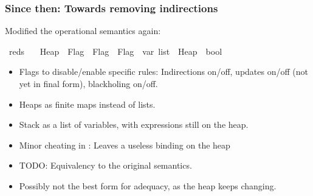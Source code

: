 \documentclass{beamer}
\begin{document}
\begin{frame}
\frametitle{Since then: Towards removing indirections}

Modified the operational semantics again:

\begin{isabelle}
\isamarkupfalse\ reds\isanewline
\ \ {\isacharcolon}{\isacharcolon}\ {\isachardoublequoteopen}Heap\ {\isasymRightarrow}\ Flag\ {\isasymRightarrow}\ Flag\ {\isasymRightarrow}\ Flag\ {\isasymRightarrow}\ var\ list\ {\isasymRightarrow}\ Heap\ {\isasymRightarrow}\ bool{\isachardoublequoteclose}\isanewline
\ \ \ \ {\isacharparenleft}{\isachardoublequoteopen}{\isacharunderscore}{\isacharslash}\ {\isasymDown}\isactrlsup {\isacharunderscore}\isactrlsup {\isacharunderscore}\isactrlsup {\isacharunderscore}\isactrlbsub {\isacharunderscore}\isactrlesub {\isacharslash}\ {\isacharunderscore}{\isachardoublequoteclose}\ {\isacharbrackleft}{}{}{\isacharcomma}{}{}{\isacharcomma}{}{}{\isacharcomma}{}{}{\isacharcomma}{}{}{\isacharbrackright}\ {}{}{\isacharparenright}
\end{isabelle}
\begin{itemize}
\item Flags to disable/enable specific rules: Indirections on/off, updates on/off (not yet in final form), blackholing on/off.
\item Heaps as finite maps instead of lists.
\item Stack as a list of variables, with expressions still on the heap.
\item Minor cheating in : Leaves a useless binding on the heap
\item TODO: Equivalency to the original semantics.
\item Possibly not the best form for adequacy, as the heap keeps changing.
\end{itemize}
\end{frame}
\end{document}
